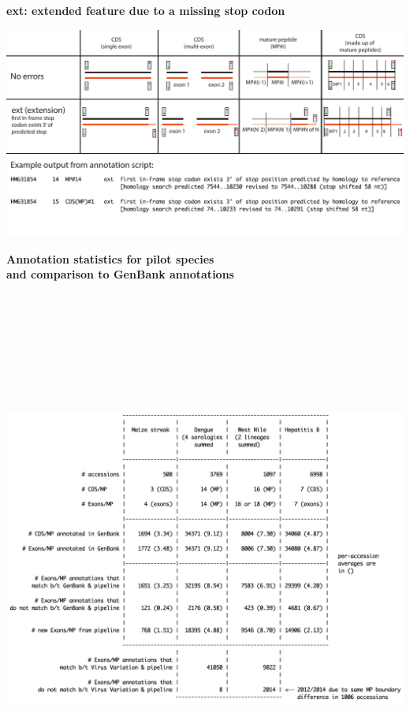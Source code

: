 \documentclass[landscape]{slides}
\begin{document}
\begin{slide}
\begin{center}
\textbf{ext: extended feature due to a missing stop codon}
\vspace{0.5in}

\includegraphics[width=10in]{figs/errornew-2-ext}
\end{center}
\vfill
\end{slide}
\begin{slide}
\begin{center}
\textbf{Annotation statistics for pilot species \\ and comparison to
  GenBank annotations}

\includegraphics[height=7in]{figs/pilot-genbank-viv-comparison-table}
\vfill
\end{center}
\end{slide}
\end{document}
